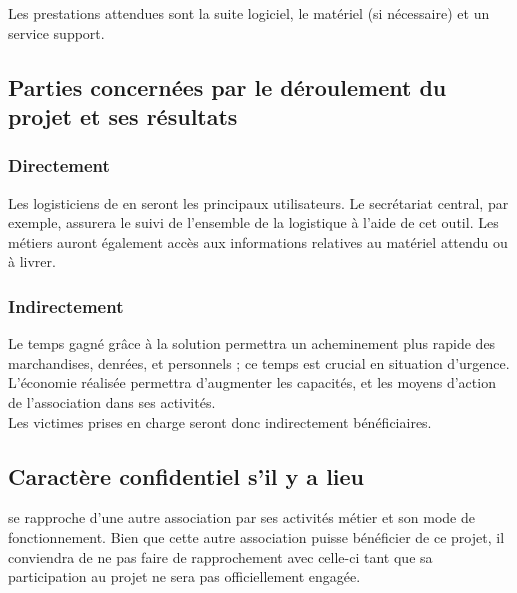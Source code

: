 Les prestations attendues sont la suite logiciel, le matériel (si nécessaire) et un service support.

\subsection{Parties concernées par le déroulement du projet et ses résultats}

\subsubsection{Directement}
Les logisticiens de \mo en seront les principaux utilisateurs. Le secrétariat central, par exemple, assurera le suivi de l'ensemble de la logistique à l'aide de cet outil.
Les métiers auront également accès aux informations relatives au matériel attendu ou à livrer.

\subsubsection{Indirectement}
Le temps gagné grâce à la solution permettra un acheminement plus rapide des marchandises, denrées, et personnels ; ce temps est crucial en situation d'urgence. L'économie réalisée permettra d'augmenter les capacités, et les moyens d'action de l'association dans ses activités.
\\
Les victimes prises en charge seront donc indirectement bénéficiaires.


\subsection{Caractère confidentiel s'il y a lieu}
\mo se rapproche d'une autre association par ses activités métier et son mode de fonctionnement. Bien que cette autre association puisse bénéficier de ce projet, il conviendra de ne pas faire de rapprochement avec celle-ci tant que sa participation au projet ne sera pas officiellement engagée.

